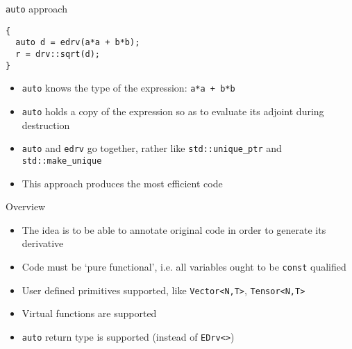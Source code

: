 \documentclass[xcolor=dvipsnames]{beamer}
\begin{document}
\begin{frame}[fragile]{\texttt{auto} approach}
\begin{lstlisting}
{
  auto d = edrv(a*a + b*b);
  r = drv::sqrt(d);
}
\end{lstlisting}

\begin{itemize}
\item \texttt{auto} knows the type of the expression: \texttt{a*a + b*b} \vspace{3mm}
\item \texttt{auto} holds a copy of the expression so as to evaluate its adjoint during destruction \vspace{3mm}
\item \texttt{auto} and \texttt{edrv} go together, rather like \texttt{std::unique\_ptr} and \texttt{std::make\_unique} \vspace{3mm}
\item This approach produces the most efficient code
\end{itemize}
\end{frame}


\begin{frame}[fragile]{Overview}
\begin{itemize}
\item The idea is to be able to annotate original code in order to generate its derivative \vspace{3mm}
\item Code must be `pure functional', i.e. all variables ought to be \texttt{const} qualified \vspace{3mm}
\item User defined primitives supported, like \texttt{Vector<N,T>}, \texttt{Tensor<N,T>} \vspace{3mm}
\item Virtual functions are supported \vspace{3mm}
\item \texttt{auto} return type is supported (instead of \texttt{EDrv<>}) \vspace{3mm}
\end{itemize}
\end{frame}


\begin{frame}[plain]
  \titlepage
\end{frame}
\end{document}
